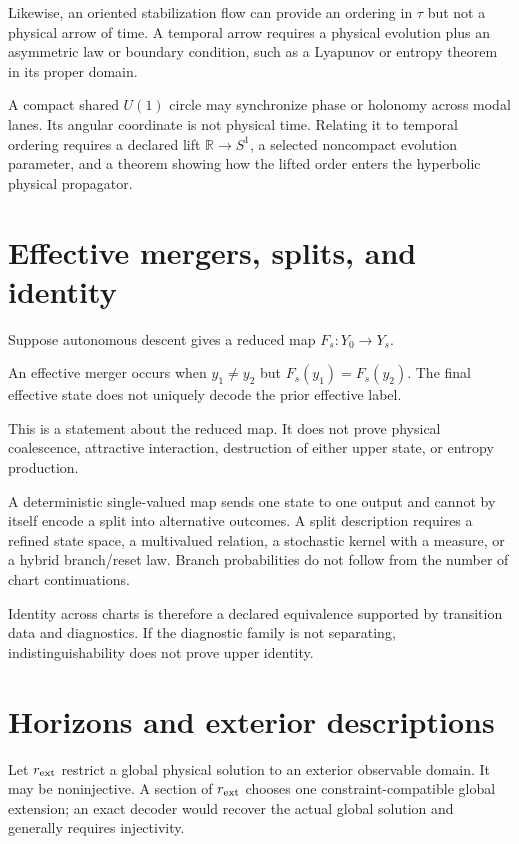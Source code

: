 \documentclass[11pt]{article}
\begin{document}
Likewise, an oriented stabilization flow can provide an ordering in $\tau$ but
not a physical arrow of time. A temporal arrow requires a physical evolution
plus an asymmetric law or boundary condition, such as a Lyapunov or entropy
theorem in its proper domain.

A compact shared $U(1)$ circle may synchronize phase or holonomy across modal
lanes. Its angular coordinate is not physical time. Relating it to temporal
ordering requires a declared lift $\mathbb R\to S^1$, a selected noncompact
evolution parameter, and a theorem showing how the lifted order enters the
hyperbolic physical propagator.

\section{Effective mergers, splits, and identity}

Suppose autonomous descent gives a reduced map $F_s:Y_0\to Y_s$.

\begin{definition}
An effective merger occurs when $y_1\ne y_2$ but
$F_s(y_1)=F_s(y_2)$. The final effective state does not uniquely decode the
prior effective label.
\end{definition}

This is a statement about the reduced map. It does not prove physical
coalescence, attractive interaction, destruction of either upper state, or
entropy production.

A deterministic single-valued map sends one state to one output and cannot by
itself encode a split into alternative outcomes. A split description requires
a refined state space, a multivalued relation, a stochastic kernel with a
measure, or a hybrid branch/reset law. Branch probabilities do not follow from
the number of chart continuations.

Identity across charts is therefore a declared equivalence supported by
transition data and diagnostics. If the diagnostic family is not separating,
indistinguishability does not prove upper identity.

\section{Horizons and exterior descriptions}

Let $r_{\rm ext}$ restrict a global physical solution to an exterior observable
domain. It may be noninjective. A section of $r_{\rm ext}$ chooses one
constraint-compatible global extension; an exact decoder would recover the
actual global solution and generally requires injectivity.
\end{document}
